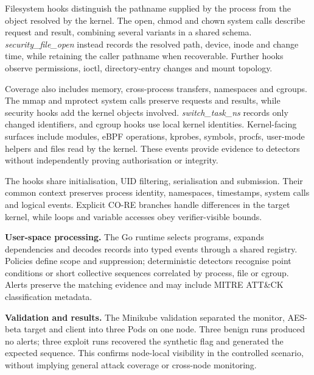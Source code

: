 \newpage
\summaryPageHeader

Filesystem hooks distinguish the pathname supplied by the process from the
object resolved by the kernel. The open, chmod and chown system calls describe
request and result, combining several variants in a shared schema.
\emph{security\_file\_open} instead records the resolved path, device, inode and
change time, while retaining the caller pathname when recoverable. Further
hooks observe permissions, ioctl, directory-entry changes and mount topology.

Coverage also includes memory, cross-process transfers, namespaces and cgroups.
The mmap and mprotect system calls preserve requests and results, while security
hooks add the kernel objects involved. \emph{switch\_task\_ns} records only
changed identifiers, and cgroup hooks use local kernel identities.
Kernel-facing surfaces include modules, eBPF operations, kprobes, symbols,
procfs, user-mode helpers and files read by the kernel. These events provide
evidence to detectors without independently proving authorisation or integrity.



The hooks share initialisation, UID filtering, serialisation and submission.
Their common context preserves process identity, namespaces, timestamps, system
calls and logical events. Explicit CO-RE branches handle differences in the
target kernel, while loops and variable accesses obey verifier-visible bounds.

\medskip
\noindent\textbf{User-space processing.}
The Go runtime selects programs, expands dependencies and decodes records into
typed events through a shared registry. Policies define scope and suppression;
deterministic detectors recognise point conditions or short collective
sequences correlated by process, file or cgroup. Alerts preserve the matching
evidence and may include MITRE ATT\&CK classification metadata.

\medskip
\noindent\textbf{Validation and results.}
The Minikube validation separated the monitor, AES-beta target and client into
three Pods on one node. Three benign runs produced no alerts; three exploit
runs recovered the synthetic flag and generated the expected sequence. This
confirms node-local visibility in the controlled scenario, without implying
general attack coverage or cross-node monitoring.
